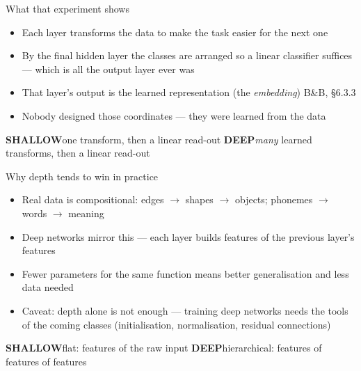 \documentclass[aspectratio=169, 11pt]{beamer}
\newcommand{\shpar}[2]{%
  \vfill
  {\scriptsize
  \begin{tcolorbox}[enhanced, sidebyside, sidebyside align=top,
                    lefthand ratio=0.485,
                    segmentation style={shc!35, line width=0.6pt},
                    colback=shc!5, colframe=shc!35, boxrule=0.5pt,
                    arc=1.2mm, left=1.6mm, right=1.6mm,
                    top=0.6mm, bottom=0.6mm,
                    before skip=0pt, after skip=0pt]
    {\color{shc}\textbf{SHALLOW}}\hspace{0.55em}#1
  \tcblower
    {\color{dpc}\textbf{DEEP}}\hspace{0.55em}#2
  \end{tcolorbox}}%
  \vspace{0.35em}%
}
\newcommand{\src}[3]{}      %
\begin{document}
\begin{frame}{What that experiment shows}
  \src{bishop2024}{section}{6.3.3}
  \vspace{0.2em}
  \begin{itemize}\setlength{\itemsep}{5pt}
    \item Each layer \alert{transforms} the data to make the task
          easier for the next one
    \item By the final hidden layer the classes are arranged so a
          \alert{linear} classifier suffices --- which is all the
          output layer ever was
    \item That layer's output is the \alert{learned representation}
          (the \emph{embedding}) \hfill{\scriptsize B\&B, \S6.3.3}
    \item Nobody designed those coordinates --- they were
          \alert{learned from the data}
  \end{itemize}
  \shpar{one transform, then a linear read-out}
        {\emph{many} learned transforms, then a linear read-out}
\end{frame}

\begin{frame}{Why depth tends to win in practice}
  \src{prince2023}{section}{4.5.5}
  \src{bishop2024}{section}{6.3.1}
  \vspace{0.2em}
  \begin{itemize}\setlength{\itemsep}{5pt}
    \item Real data is \alert{compositional}: edges $\to$ shapes
          $\to$ objects; phonemes $\to$ words $\to$ meaning
    \item Deep networks mirror this --- each layer builds
          \alert{features of the previous layer's features}
    \item Fewer parameters for the same function means
          \alert{better generalisation} and less data needed
    \item Caveat: depth alone is not enough --- training deep
          networks needs the tools of the coming classes
          (initialisation, normalisation, residual connections)
  \end{itemize}
  \shpar{flat: features of the raw input}
        {hierarchical: features of features of features}
\end{frame}
\end{document}
